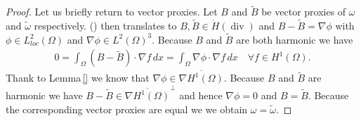 \documentclass[12pt,a4paper]{article}
\numberwithin{equation}{subsection}
\numberwithin{lemma}{subsection}
\theoremstyle{definition}
\DeclareMathOperator{\diver}{div}
\newcommand{\rop}{\mathscr{R}} %
\begin{document}
\begin{proof}
    Let us briefly return to vector proxies. Let $B$ and $\tilde{B}$ be 
    vector proxies of $\omega$ and $\tilde{\omega}$ respectively. 
    () then translates to 
    $B, \tilde{B} \in \mathring{H}(\diver)$ %
    and $B-\tilde{B} = \nabla \phi$ with $\phi \in L^2_{loc}(\Omega)$ and
    $\nabla \phi \in L^2(\Omega)^3$.
    Because $B$ and $\tilde{B}$ are both harmonic we have 
    \begin{align*}
        0 = \int_\Omega (B-\tilde{B}) \cdot \nabla f\, dx 
        = \int_\Omega \nabla \phi \cdot \nabla f \,dx
        \quad \forall 
        f \in H^1(\Omega).
    \end{align*}
    Thank to Lemma\,\ref{} we know that 
    $\nabla \phi \in \overline{\nabla H^1(\Omega)}$. 
    Because $B$ and $\tilde{B}$ are harmonic we have 
    $B - \tilde{B} \in 
    \overline{\nabla H^1(\Omega)}^\perp$ and hence $\nabla \phi = 0$
    and $B = \tilde{B}$. Because the corresponding vector proxies are equal we 
    we obtain $\omega = \tilde{\omega}$.
\end{proof}



    
\end{document}
